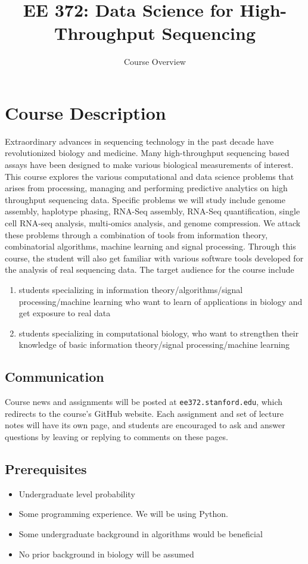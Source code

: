 \documentclass[11pt,onecolumn]{article}
\title{EE 372: Data Science for High-Throughput Sequencing}
\author{Course Overview}
\date{\vspace{-5ex}}
\begin{document}
\maketitle

\section*{Course Description}
Extraordinary advances in sequencing technology in the past decade have revolutionized biology and medicine. Many high-throughput sequencing based assays have been designed to make various biological measurements of interest. This course explores the various computational and data science problems that arises from processing, managing and performing predictive analytics on high throughput sequencing data. Specific problems we will study include genome assembly, haplotype phasing, RNA-Seq assembly, RNA-Seq quantification, single cell RNA-seq analysis, multi-omics analysis, and genome compression. We attack these problems through a combination of tools from information theory, combinatorial algorithms, machine learning and signal processing. Through this course, the student will also get familiar with various software tools developed for the analysis of real sequencing data. The target audience for the course include
\begin{enumerate}
	\itemsep0em 
	\item students specializing in information theory/algorithms/signal processing/machine learning who want to learn of applications in biology and get exposure to real data
	\item students specializing in computational biology, who want to strengthen their knowledge of basic information theory/signal processing/machine learning
\end{enumerate}

\subsection*{Communication}
Course news and assignments will be posted at \texttt{ee372.stanford.edu}, which redirects to the course's GitHub website. Each assignment and set of lecture notes will have its own page, and students are encouraged to ask and answer questions by leaving or replying to comments on these pages.

\subsection*{Prerequisites}
\begin{itemize}
	\itemsep0em 
	\item Undergraduate level probability
	\item Some programming experience. We will be using Python.
	\item Some undergraduate background in algorithms would be beneficial
	\item No prior background in biology will be assumed
\end{itemize}
\end{document}
